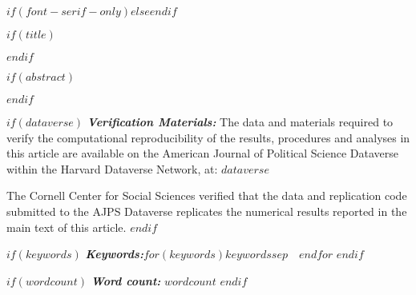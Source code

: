 $if(font-serif-only)$$else$\allsectionsfont{\sffamily}$endif$

$if(title)$
\maketitle
$endif$


$if(abstract)$
\begin{abstract}
$abstract$
\end{abstract}
$endif$

$if(dataverse)$
\textbf{\textit{Verification Materials:}}
The data and materials required to verify the computational reproducibility of the results, procedures and analyses in this article are available on the American Journal of Political Science Dataverse within the Harvard Dataverse Network, at: 
$dataverse$


The Cornell Center for Social Sciences verified that the data and replication code submitted to the AJPS Dataverse replicates the numerical results reported in the main text of this article.
$endif$

$if(keywords)$
\textbf{\textit{Keywords:}}\quad $for(keywords)$$keywords$$sep$~\textbullet~$endfor$
$endif$

$if(wordcount)$
\textbf{\textit{Word count:}} $wordcount$
$endif$
